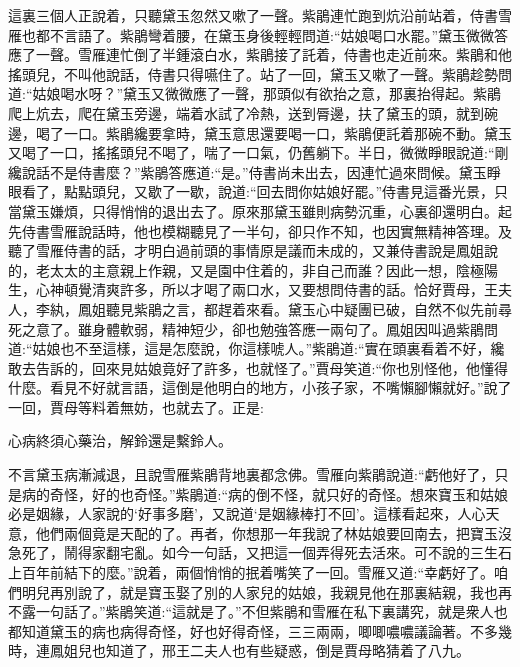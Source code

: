 \begin{parag}
    這裏三個人正說着，只聽黛玉忽然又嗽了一聲。紫鵑連忙跑到炕沿前站着，侍書雪雁也都不言語了。紫鵑彎着腰，在黛玉身後輕輕問道:“姑娘喝口水罷。”黛玉微微答應了一聲。雪雁連忙倒了半鍾滾白水，紫鵑接了託着，侍書也走近前來。紫鵑和他搖頭兒，不叫他說話，侍書只得嚥住了。站了一回，黛玉又嗽了一聲。紫鵑趁勢問道:“姑娘喝水呀？”黛玉又微微應了一聲，那頭似有欲抬之意，那裏抬得起。紫鵑爬上炕去，爬在黛玉旁邊，端着水試了冷熱，送到脣邊，扶了黛玉的頭，就到碗邊，喝了一口。紫鵑纔要拿時，黛玉意思還要喝一口，紫鵑便託着那碗不動。黛玉又喝了一口，搖搖頭兒不喝了，喘了一口氣，仍舊躺下。半日，微微睜眼說道:“剛纔說話不是侍書麼？”紫鵑答應道:“是。”侍書尚未出去，因連忙過來問候。黛玉睜眼看了，點點頭兒，又歇了一歇，說道:“回去問你姑娘好罷。”侍書見這番光景，只當黛玉嫌煩，只得悄悄的退出去了。原來那黛玉雖則病勢沉重，心裏卻還明白。起先侍書雪雁說話時，他也模糊聽見了一半句，卻只作不知，也因實無精神答理。及聽了雪雁侍書的話，才明白過前頭的事情原是議而未成的，又兼侍書說是鳳姐說的，老太太的主意親上作親，又是園中住着的，非自己而誰？因此一想，陰極陽生，心神頓覺清爽許多，所以才喝了兩口水，又要想問侍書的話。恰好賈母，王夫人，李紈，鳳姐聽見紫鵑之言，都趕着來看。黛玉心中疑團已破，自然不似先前尋死之意了。雖身體軟弱，精神短少，卻也勉強答應一兩句了。鳳姐因叫過紫鵑問道:“姑娘也不至這樣，這是怎麼說，你這樣唬人。”紫鵑道:“實在頭裏看着不好，纔敢去告訴的，回來見姑娘竟好了許多，也就怪了。”賈母笑道:“你也別怪他，他懂得什麼。看見不好就言語，這倒是他明白的地方，小孩子家，不嘴懶腳懶就好。”說了一回，賈母等料着無妨，也就去了。正是:
\end{parag}


\begin{poem}
    \begin{pl}
        心病終須心藥治，解鈴還是繫鈴人。
    \end{pl}
\end{poem}


\begin{parag}
    不言黛玉病漸減退，且說雪雁紫鵑背地裏都念佛。雪雁向紫鵑說道:“虧他好了，只是病的奇怪，好的也奇怪。”紫鵑道:“病的倒不怪，就只好的奇怪。想來寶玉和姑娘必是姻緣，人家說的‘好事多磨’，又說道‘是姻緣棒打不回’。這樣看起來，人心天意，他們兩個竟是天配的了。再者，你想那一年我說了林姑娘要回南去，把寶玉沒急死了，鬧得家翻宅亂。如今一句話，又把這一個弄得死去活來。可不說的三生石上百年前結下的麼。”說着，兩個悄悄的抿着嘴笑了一回。雪雁又道:“幸虧好了。咱們明兒再別說了，就是寶玉娶了別的人家兒的姑娘，我親見他在那裏結親，我也再不露一句話了。”紫鵑笑道:“這就是了。”不但紫鵑和雪雁在私下裏講究，就是衆人也都知道黛玉的病也病得奇怪，好也好得奇怪，三三兩兩，唧唧噥噥議論著。不多幾時，連鳳姐兒也知道了，邢王二夫人也有些疑惑，倒是賈母略猜着了八九。
\end{parag}


